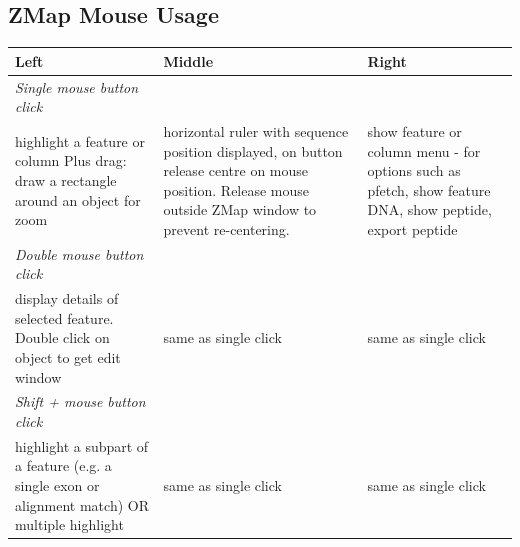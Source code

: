 \documentclass[letterpaper]{article}
\begin{document}
\subsection{ZMap Mouse Usage}
\begin{supertabular}{|m{4.8cm}|m{4.8cm}|m{4.8cm}|}
\hline
Left & Middle & Right\\
\hline
\textit{Single mouse button click} & & \\\hline
highlight a feature or column
Plus drag: draw a rectangle around an object for zoom &
horizontal ruler with sequence position displayed, on button release centre on mouse position.
Release mouse outside ZMap window to prevent re-centering.&
show feature or column menu - for options such as pfetch, show feature DNA, show peptide, export peptide\\
\hline
\textit{Double mouse button click} & & \\\hline
display details of selected feature. Double click on object to get edit window&
same as single click&
same as single click\\
\hline
\textit{Shift + mouse button click} & & \\\hline
highlight a subpart of a feature (e.g. a single exon or alignment match)
OR multiple highlight&
same as single click&
same as single click\\
\hline
\end{supertabular}
\end{document}

